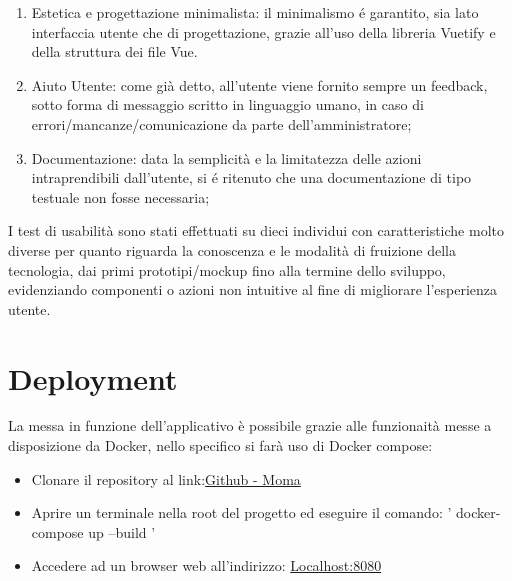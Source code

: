 \documentclass{report}
\begin{document}
\begin{enumerate}
    \item Estetica e progettazione minimalista: il minimalismo é garantito, sia lato interfaccia utente che di progettazione, grazie all’uso della libreria Vuetify e della struttura dei file Vue.
    \item Aiuto Utente: come già detto, all’utente viene fornito sempre un feedback, sotto forma di messaggio scritto in linguaggio umano, in caso di errori/mancanze/comunicazione da parte dell’amministratore;
    \item Documentazione: data la semplicità e la limitatezza delle azioni intraprendibili dall’utente, si é ritenuto che una documentazione di tipo testuale non fosse necessaria;
\end{enumerate}
I test di usabilità sono stati effettuati su dieci individui con caratteristiche molto diverse per quanto riguarda la conoscenza e le modalità di fruizione della tecnologia, dai primi prototipi/mockup fino alla termine dello sviluppo, evidenziando componenti o azioni non intuitive al fine di migliorare l’esperienza utente.

\newpage

\section{Deployment}
La messa in funzione dell'applicativo è possibile grazie alle funzionaità messe a disposizione da Docker, nello specifico si farà uso di Docker compose:
\begin{itemize}
    \item Clonare il repository al link:\href{https://github.com/MicheleTorroni/MoMa}{Github - Moma}%
    \item Aprire un terminale nella root del progetto ed eseguire il comando: ' docker-compose up --build '
    \item Accedere ad un browser web all'indirizzo: \href{http://localhost:8080/}{Localhost:8080}
\end{itemize}
\newpage
\end{document}
